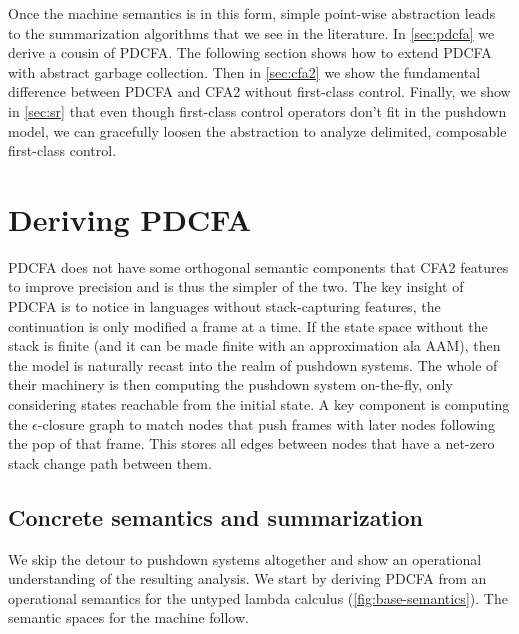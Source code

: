 Once the machine semantics is in this form, simple point-wise abstraction leads to the summarization algorithms that we see in the literature.
%
In \autoref{sec:pdcfa} we derive a cousin of PDCFA.
%
The following section shows how to extend PDCFA with abstract garbage collection. %
%
Then in \autoref{sec:cfa2} we show the fundamental difference between PDCFA and CFA2 without first-class control. %
%
%
Finally, we show in \autoref{sec:sr} that even though first-class control operators don't fit in the pushdown model, we can gracefully loosen the abstraction to analyze delimited, composable first-class control.

\section{Deriving PDCFA}
\label{sec:pdcfa}

PDCFA does not have some orthogonal semantic components that CFA2 features to improve precision and is thus the simpler of the two.
%
The key insight of PDCFA is to notice in languages without stack-capturing features, the continuation is only modified a frame at a time.
%
If the state space without the stack is finite (and it can be made finite with an approximation ala AAM), then the model is naturally recast into the realm of pushdown systems.
%
The whole of their machinery is then computing the pushdown system on-the-fly, only considering states reachable from the initial state.
%
A key component is computing the $\epsilon$-closure graph to match nodes that push frames with later nodes following the pop of that frame.
%
This stores all edges between nodes that have a net-zero stack change path between them.
%

\subsection{Concrete semantics and summarization}
We skip the detour to pushdown systems altogether and show an operational understanding of the resulting analysis.
%
We start by deriving PDCFA from an operational semantics for the untyped lambda calculus (\autoref{fig:base-semantics}).
%
The semantic spaces for the machine follow.

